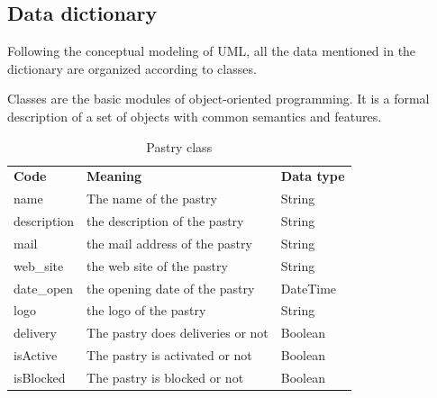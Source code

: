 \documentclass[12pt,a4paper]{report}
\begin{document}
	\subsection{Data dictionary}
	Following the conceptual modeling of UML, all the data mentioned in the dictionary are organized according to classes.\par 
	Classes are the basic modules of object-oriented programming. It is a formal description of a set of objects with common semantics and features.
	\begin{table}[H]
		\begin{center}
			\captionsetup[table]{skip=10pt}
			\caption{Pastry class}
			\setlength\doublerulesep{0.5pt}
			
			\begin{tabular}{|  p{5cm}|  p{6cm}|  p{4cm}|}
				\rowcolor{LightCyan}
				
				\hline
				\multicolumn{3}{c}{Pastry class}\\
				\hline 
				\textbf{Code} & \textbf{Meaning} & \textbf{Data type} 
				\\ \hline
				
				name &                        
				The name of the pastry &                        
				String                     
				
				\\ \hline
				
				description &                        
				the description of the pastry &                        
				String   
				\\ \hline
				
				mail &                        
				the mail address of the pastry &                        
				String 
				\\ \hline
				
				web\_site &                        
				the web site of the pastry &                        
				String   
				\\ \hline
				
				date\_open &                        
				the opening date of the pastry &                        
				DateTime  
				\\ \hline
				
				logo &                        
				the logo of the pastry &                        
				String  
				\\ \hline
				
				delivery &                        
				The pastry does deliveries or not &                        
				Boolean
				\\ \hline
				
				isActive &                        
				The pastry is activated or not &                        
				Boolean
				\\ \hline
				
				isBlocked &                        
				The pastry is blocked or not &                        
				Boolean      
				
				\\ \hline
				
			\end{tabular}
			
		\end{center}
	\end{table}
\end{document}
